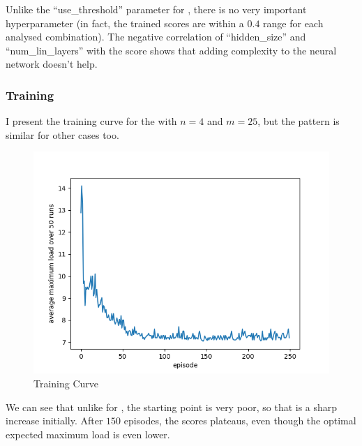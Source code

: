 Unlike the ``use\_threshold'' parameter for \TwoThinning, there is no very important hyperparameter (in fact, the trained scores are within a $0.4$ range for each analysed combination). The negative correlation of ``hidden\_size'' and ``num\_lin\_layers'' with the score shows that adding complexity to the neural network doesn't help.


\subsubsection{Training}

I present the training curve for the \HypercubeGraph with $n=4$ and $m=25$, but the pattern is similar for other cases too.


\begin{figure}[h] \label{graphical-two-choice-hyperparameter-importance}
    \centering
    \includegraphics[scale=0.6]{Chapter4/Figs/training_progression_hypercube_4_25.png}
    \caption{\GraphicalTwoChoice Training Curve}
\end{figure}

We can see that unlike for \TwoThinning, the starting point is very poor, so that is a sharp increase initially. After $150$ episodes, the scores plateaus, even though the optimal expected maximum load is even lower.
